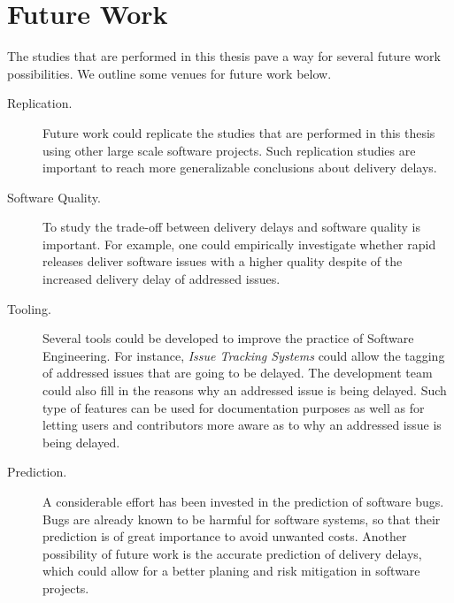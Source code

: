 \section{Future Work}

The studies that are performed in this thesis pave a way for several future
work possibilities. We outline some venues for future work below. 

\begin{description}

	\item[Replication.] Future work could replicate the studies that are
		performed in this thesis using other large scale software
		projects. Such replication studies are important to reach more
		generalizable conclusions about delivery delays\DIFaddbegin {}\DIFaddend .

	\item[Software Quality.] To study the trade-off between delivery delays
		and software quality is important. For example, one could
		empirically investigate whether rapid releases deliver software
		issues with a higher quality despite of the increased delivery
		delay of addressed issues.

	\item[Tooling.] Several tools could be developed to improve the practice
		of Software Engineering. For instance, {\em Issue Tracking
		Systems} could allow the tagging of addressed issues that are
		going to be delayed. The development team could also fill in the
		reasons why an addressed issue is being delayed. Such type of
		features can be used for documentation purposes as well as for
		letting users and contributors more aware as to why an addressed
		issue is being delayed.

	\item[Prediction.] A considerable effort has been invested in the
		prediction of software bugs. Bugs are already known to be
		harmful for software systems, so that their prediction is of
		great importance to avoid unwanted costs. Another possibility of
		future work is the accurate prediction of delivery delays, which
		could allow for a better planing and risk mitigation in software
		projects.

\end{description}

